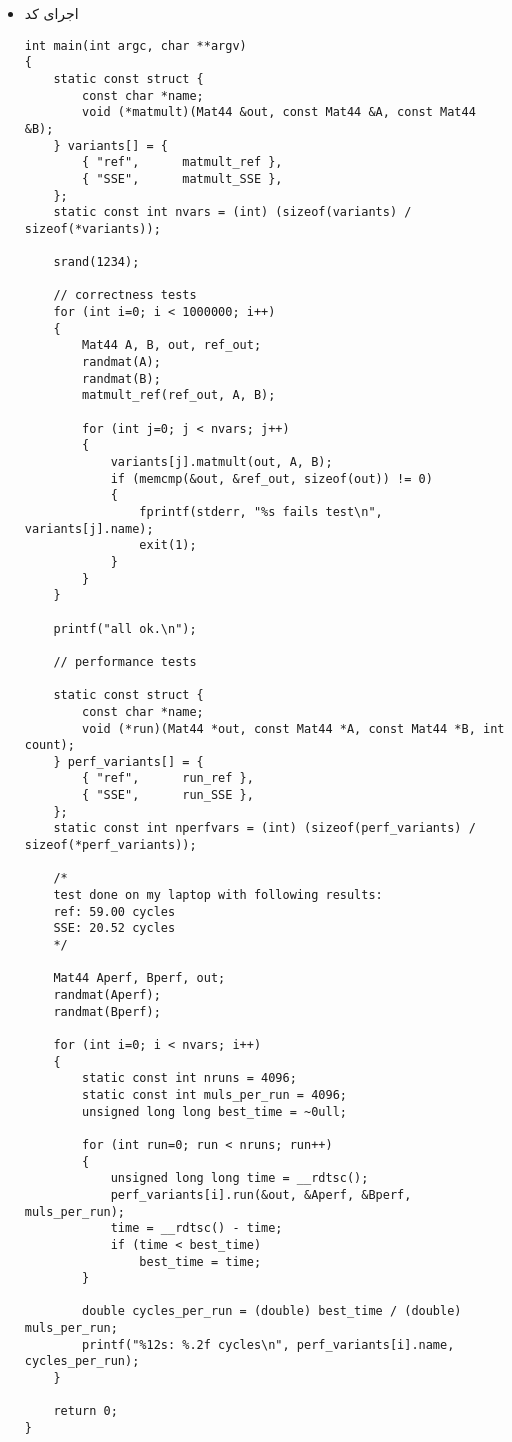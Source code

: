 \begin{itemize}
\begin{itemize}
\begin{Verbatim}[tabsize=4]
			\end{Verbatim}
			\item
			اجرای ضرب به کمک 
			\begin{Verbatim}[tabsize=4]
static void run_SSE(Mat44 *out, const Mat44 *A, const Mat44 *B, int count)
{
	for (int i=0; i < count; i++)
	{
		int j = i & the_mask;
		matmult_SSE(out[j], A[j], B[j]);
	}
}
			\end{Verbatim}
		\end{itemize}
	\item اجرای کد
	\begin{Verbatim}[tabsize=4]
int main(int argc, char **argv)
{
	static const struct {
		const char *name;
		void (*matmult)(Mat44 &out, const Mat44 &A, const Mat44 &B);
	} variants[] = {
		{ "ref",      matmult_ref },
		{ "SSE",      matmult_SSE },
	};
	static const int nvars = (int) (sizeof(variants) / sizeof(*variants));
	
	srand(1234);
	
	// correctness tests
	for (int i=0; i < 1000000; i++)
	{
		Mat44 A, B, out, ref_out;
		randmat(A);
		randmat(B);
		matmult_ref(ref_out, A, B);
		
		for (int j=0; j < nvars; j++)
		{
			variants[j].matmult(out, A, B);
			if (memcmp(&out, &ref_out, sizeof(out)) != 0)
			{
				fprintf(stderr, "%s fails test\n", variants[j].name);
				exit(1);
			}
		}
	}
	
	printf("all ok.\n");
	
	// performance tests
	
	static const struct {
		const char *name;
		void (*run)(Mat44 *out, const Mat44 *A, const Mat44 *B, int count);
	} perf_variants[] = {
		{ "ref",      run_ref },
		{ "SSE",      run_SSE },
	};
	static const int nperfvars = (int) (sizeof(perf_variants) / sizeof(*perf_variants));
	
	/* 
	test done on my laptop with following results:
	ref: 59.00 cycles
	SSE: 20.52 cycles
	*/
	
	Mat44 Aperf, Bperf, out;
	randmat(Aperf);
	randmat(Bperf);
	
	for (int i=0; i < nvars; i++)
	{
		static const int nruns = 4096;
		static const int muls_per_run = 4096;
		unsigned long long best_time = ~0ull;
		
		for (int run=0; run < nruns; run++)
		{
			unsigned long long time = __rdtsc();
			perf_variants[i].run(&out, &Aperf, &Bperf, muls_per_run);
			time = __rdtsc() - time;
			if (time < best_time)
				best_time = time;
		}
		
		double cycles_per_run = (double) best_time / (double) muls_per_run;
		printf("%12s: %.2f cycles\n", perf_variants[i].name, cycles_per_run);
	}
	
	return 0;
}

	\end{Verbatim}
\end{itemize}